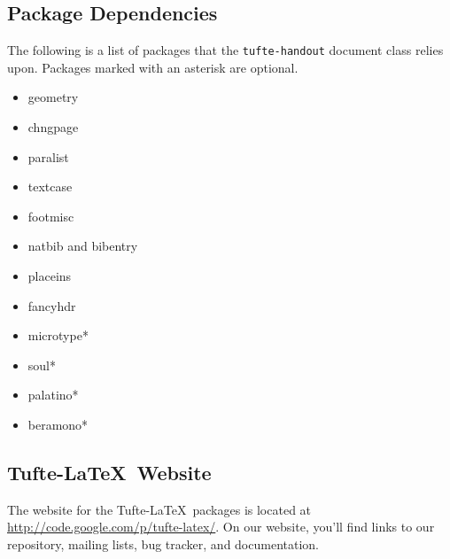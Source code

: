\documentclass{tufte-handout}
\begin{document}
\subsection{Package Dependencies}\label{sec:dependencies}
The following is a list of packages that the \Verb|tufte-handout| document
class relies upon.  Packages marked with an asterisk are optional.
\begin{multicols}{2}
\begin{itemize}
  \item geometry
  \item chngpage
  \item paralist
  \item textcase
  \item footmisc
  \item natbib and bibentry
  \item placeins
  \item fancyhdr 
  \item microtype*
  \item soul*
  \item palatino*
  \item beramono*
\end{itemize}
\end{multicols}

\subsection{Tufte-\LaTeX\ Website}\label{sec:website}
The website for the Tufte-\LaTeX\ packages is located at
\url{http://code.google.com/p/tufte-latex/}.  On our website, you'll find
links to our  repository, mailing lists, bug tracker, and documentation.





\end{document}
